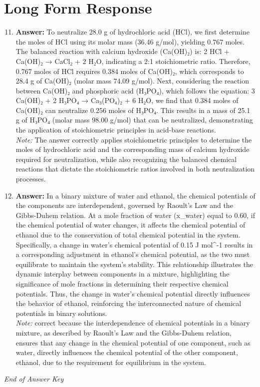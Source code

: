 \documentclass[12pt]{article}
\begin{document}
\section*{Long Form Response}
\begin{enumerate}[label=\arabic*.]
\setcounter{enumi}{10}
\item \textbf{Answer:} To neutralize 28.0 g of hydrochloric acid (HCl), we first determine the moles of HCl using its molar mass (36.46 g/mol), yielding 0.767 moles. The balanced reaction with calcium hydroxide (Ca(OH)₂) is: 2 HCl + Ca(OH)₂ → CaCl₂ + 2 H₂O, indicating a 2:1 stoichiometric ratio. Therefore, 0.767 moles of HCl requires 0.384 moles of Ca(OH)₂, which corresponds to 28.4 g of Ca(OH)₂ (molar mass 74.09 g/mol). Next, considering the reaction between Ca(OH)₂ and phosphoric acid (H₃PO₄), which follows the equation: 3 Ca(OH)₂ + 2 H₃PO₄ → Ca₃(PO₄)₂ + 6 H₂O, we find that 0.384 moles of Ca(OH)₂ can neutralize 0.256 moles of H₃PO₄. This results in a mass of 25.1 g of H₃PO₄ (molar mass 98.00 g/mol) that can be neutralized, demonstrating the application of stoichiometric principles in acid-base reactions.
\\ \textit{Note:} The answer correctly applies stoichiometric principles to determine the moles of hydrochloric acid and the corresponding mass of calcium hydroxide required for neutralization, while also recognizing the balanced chemical reactions that dictate the stoichiometric ratios involved in both neutralization processes.
\item \textbf{Answer:} In a binary mixture of water and ethanol, the chemical potentials of the components are interdependent, governed by Raoult's Law and the Gibbs-Duhem relation. At a mole fraction of water (x\_water) equal to 0.60, if the chemical potential of water changes, it affects the chemical potential of ethanol due to the conservation of total chemical potential in the system. Specifically, a change in water's chemical potential of 0.15 J mol^-1 results in a corresponding adjustment in ethanol's chemical potential, as the two must equilibrate to maintain the system's stability. This relationship illustrates the dynamic interplay between components in a mixture, highlighting the significance of mole fractions in determining their respective chemical potentials. Thus, the change in water's chemical potential directly influences the behavior of ethanol, reinforcing the interconnected nature of chemical potentials in binary solutions.
\\ \textit{Note:} correct because the interdependence of chemical potentials in a binary mixture, as described by Raoult's Law and the Gibbs-Duhem relation, ensures that any change in the chemical potential of one component, such as water, directly influences the chemical potential of the other component, ethanol, due to the requirement for equilibrium in the system.
\end{enumerate}

\vfill
\noindent\textit{End of Answer Key}
\end{document}
